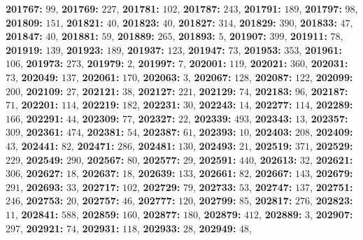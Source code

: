 \textsf{\bfseries 201767:} $99$, \textsf{\bfseries 201769:} $227$, \textsf{\bfseries 201781:} $102$, \textsf{\bfseries 201787:} $243$, \textsf{\bfseries 201791:} $189$, \textsf{\bfseries 201797:} $98$, \textsf{\bfseries 201809:} $151$, \textsf{\bfseries 201821:} $40$, \textsf{\bfseries 201823:} $40$, \textsf{\bfseries 201827:} $314$, \textsf{\bfseries 201829:} $390$, \textsf{\bfseries 201833:} $47$, \textsf{\bfseries 201847:} $40$, \textsf{\bfseries 201881:} $59$, \textsf{\bfseries 201889:} $265$, \textsf{\bfseries 201893:} $5$, \textsf{\bfseries 201907:} $399$, \textsf{\bfseries 201911:} $78$, \textsf{\bfseries 201919:} $139$, \textsf{\bfseries 201923:} $189$, \textsf{\bfseries 201937:} $123$, \textsf{\bfseries 201947:} $73$, \textsf{\bfseries 201953:} $353$, \textsf{\bfseries 201961:} $106$, \textsf{\bfseries 201973:} $273$, \textsf{\bfseries 201979:} $2$, \textsf{\bfseries 201997:} $7$, \textsf{\bfseries 202001:} $119$, \textsf{\bfseries 202021:} $360$, \textsf{\bfseries 202031:} $73$, \textsf{\bfseries 202049:} $137$, \textsf{\bfseries 202061:} $170$, \textsf{\bfseries 202063:} $3$, \textsf{\bfseries 202067:} $128$, \textsf{\bfseries 202087:} $122$, \textsf{\bfseries 202099:} $200$, \textsf{\bfseries 202109:} $27$, \textsf{\bfseries 202121:} $38$, \textsf{\bfseries 202127:} $221$, \textsf{\bfseries 202129:} $74$, \textsf{\bfseries 202183:} $96$, \textsf{\bfseries 202187:} $71$, \textsf{\bfseries 202201:} $114$, \textsf{\bfseries 202219:} $182$, \textsf{\bfseries 202231:} $30$, \textsf{\bfseries 202243:} $14$, \textsf{\bfseries 202277:} $114$, \textsf{\bfseries 202289:} $166$, \textsf{\bfseries 202291:} $44$, \textsf{\bfseries 202309:} $77$, \textsf{\bfseries 202327:} $22$, \textsf{\bfseries 202339:} $493$, \textsf{\bfseries 202343:} $13$, \textsf{\bfseries 202357:} $309$, \textsf{\bfseries 202361:} $474$, \textsf{\bfseries 202381:} $54$, \textsf{\bfseries 202387:} $61$, \textsf{\bfseries 202393:} $10$, \textsf{\bfseries 202403:} $208$, \textsf{\bfseries 202409:} $43$, \textsf{\bfseries 202441:} $82$, \textsf{\bfseries 202471:} $286$, \textsf{\bfseries 202481:} $130$, \textsf{\bfseries 202493:} $21$, \textsf{\bfseries 202519:} $371$, \textsf{\bfseries 202529:} $229$, \textsf{\bfseries 202549:} $290$, \textsf{\bfseries 202567:} $80$, \textsf{\bfseries 202577:} $29$, \textsf{\bfseries 202591:} $440$, \textsf{\bfseries 202613:} $32$, \textsf{\bfseries 202621:} $306$, \textsf{\bfseries 202627:} $18$, \textsf{\bfseries 202637:} $18$, \textsf{\bfseries 202639:} $133$, \textsf{\bfseries 202661:} $82$, \textsf{\bfseries 202667:} $143$, \textsf{\bfseries 202679:} $291$, \textsf{\bfseries 202693:} $33$, \textsf{\bfseries 202717:} $102$, \textsf{\bfseries 202729:} $79$, \textsf{\bfseries 202733:} $53$, \textsf{\bfseries 202747:} $137$, \textsf{\bfseries 202751:} $246$, \textsf{\bfseries 202753:} $20$, \textsf{\bfseries 202757:} $46$, \textsf{\bfseries 202777:} $120$, \textsf{\bfseries 202799:} $85$, \textsf{\bfseries 202817:} $276$, \textsf{\bfseries 202823:} $11$, \textsf{\bfseries 202841:} $588$, \textsf{\bfseries 202859:} $160$, \textsf{\bfseries 202877:} $180$, \textsf{\bfseries 202879:} $412$, \textsf{\bfseries 202889:} $3$, \textsf{\bfseries 202907:} $297$, \textsf{\bfseries 202921:} $74$, \textsf{\bfseries 202931:} $118$, \textsf{\bfseries 202933:} $28$, \textsf{\bfseries 202949:} $48$, 
